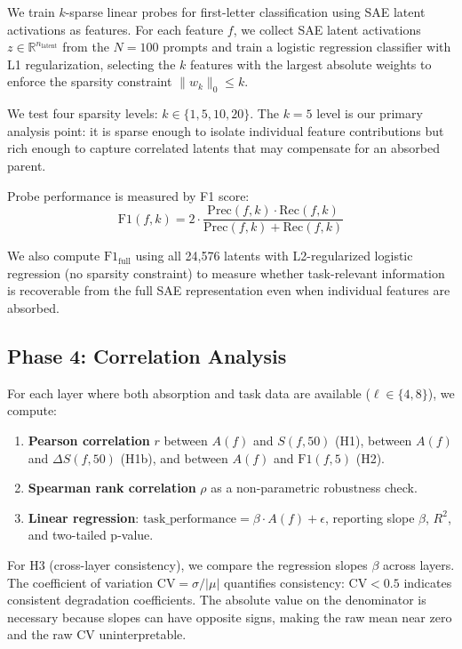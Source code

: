 \documentclass{article}
\begin{document}
We train $k$-sparse linear probes for first-letter classification using SAE latent activations as features. For each feature $f$, we collect SAE latent activations $z \in \mathbb{R}^{n_{\text{latent}}}$ from the $N = 100$ prompts and train a logistic regression classifier with L1 regularization, selecting the $k$ features with the largest absolute weights to enforce the sparsity constraint $\|w_k\|_0 \leq k$.

We test four sparsity levels: $k \in \{1, 5, 10, 20\}$. The $k = 5$ level is our primary analysis point: it is sparse enough to isolate individual feature contributions but rich enough to capture correlated latents that may compensate for an absorbed parent.

Probe performance is measured by F1 score:
\begin{equation}
\text{F1}(f, k) = 2 \cdot \frac{\text{Prec}(f, k) \cdot \text{Rec}(f, k)}{\text{Prec}(f, k) + \text{Rec}(f, k)}
\end{equation}

We also compute $\text{F1}_{\text{full}}$ using all 24,576 latents with L2-regularized logistic regression (no sparsity constraint) to measure whether task-relevant information is recoverable from the full SAE representation even when individual features are absorbed.

\subsection{Phase 4: Correlation Analysis}

For each layer where both absorption and task data are available ($\ell \in \{4, 8\}$), we compute:

\begin{enumerate}
    \item \textbf{Pearson correlation} $r$ between $A(f)$ and $S(f, 50)$ (H1), between $A(f)$ and $\Delta S(f, 50)$ (H1b), and between $A(f)$ and $\text{F1}(f, 5)$ (H2).
    \item \textbf{Spearman rank correlation} $\rho$ as a non-parametric robustness check.
    \item \textbf{Linear regression}: $\text{task\_performance} = \beta \cdot A(f) + \epsilon$, reporting slope $\beta$, $R^2$, and two-tailed p-value.
\end{enumerate}

For H3 (cross-layer consistency), we compare the regression slopes $\beta$ across layers. The coefficient of variation $\text{CV} = \sigma / |\mu|$ quantifies consistency: $\text{CV} < 0.5$ indicates consistent degradation coefficients. The absolute value on the denominator is necessary because slopes can have opposite signs, making the raw mean near zero and the raw CV uninterpretable.
\end{document}
